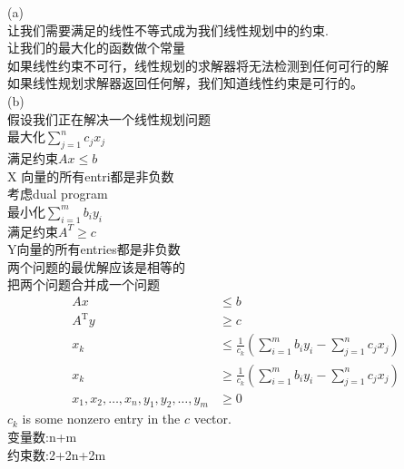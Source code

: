 \documentclass[a4paper, justified]{tufte-handout}
\begin{document}
\begin{solution}
  (a)\\
  让我们需要满足的线性不等式成为我们线性规划中的约束.\\
  让我们的最大化的函数做个常量\\
  如果线性约束不可行，线性规划的求解器将无法检测到任何可行的解\\
  如果线性规划求解器返回任何解，我们知道线性约束是可行的。\\
  (b)\\
  假设我们正在解决一个线性规划问题\\
  最大化$\sum_{j=1}^{n}c_jx_j$\\
  满足约束$Ax \leq b$\\
  X 向量的所有entri都是非负数\\
  考虑dual program\\
  最小化$\sum_{i=1}^{m}b_iy_i$\\
  满足约束$A^T\geq c$\\
  Y向量的所有entries都是非负数\\
  两个问题的最优解应该是相等的\\
  把两个问题合并成一个问题\\
  $$
    \begin{aligned}
      A x                                          & \leq b                                                                   \\
      A^{\mathrm{T}} y                             & \geq c                                                                   \\
      x_k                                          & \leq \frac{1}{c_k}\left(\sum_{i=1}^m b_i y_i-\sum_{j=1}^n c_j x_j\right) \\
      x_k                                          & \geq \frac{1}{c_k}\left(\sum_{i=1}^m b_i y_i-\sum_{j=1}^n c_j x_j\right) \\
      x_1, x_2, \ldots, x_n, y_1, y_2, \ldots, y_m & \geq 0
    \end{aligned}
  $$
  $c_k$ is some nonzero entry in the $c$ vector.\\
  变量数:n+m\\
  约束数:2+2n+2m
\end{solution}

\beginoptional
\begin{problem}[TC Problem 29-2]
\end{problem}
\end{document}
